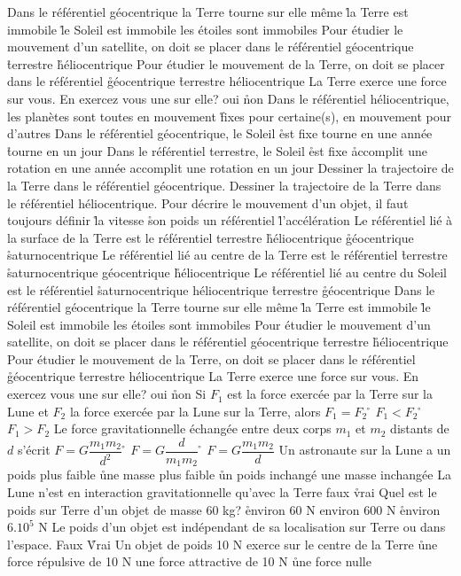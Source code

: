 \q
Dans le référentiel géocentrique
\rv
la Terre tourne sur elle même
\r
la Terre est immobile
\r
le Soleil est immobile
\rv
les étoiles sont immobiles
\q
Pour étudier le mouvement d'un satellite, on doit se placer dans le référentiel
\rv
géocentrique
\r
terrestre
\r
héliocentrique
\q
Pour étudier le mouvement de la Terre, on doit se placer dans le référentiel
\r
géocentrique
\r
terrestre
\rv
héliocentrique
\q
La Terre exerce une force sur vous. En exercez vous une sur elle?
\rv
oui
\r
non
\q
Dans le référentiel héliocentrique, les planètes sont
\rv
toutes en mouvement
\r
fixes pour certaine(s), en mouvement pour d'autres
\q
Dans le référentiel géocentrique, le Soleil 
\r
est fixe
\rv
tourne en une année
\r
tourne en un jour
\q
Dans le référentiel terrestre, le Soleil 
\r
est fixe
\r
accomplit une rotation en une année
\rv
accomplit une rotation en un jour
\q
Dessiner la trajectoire de la Terre dans le référentiel géocentrique.
\q
Dessiner la trajectoire de la Terre dans le référentiel héliocentrique.
 \q
        Pour décrire le mouvement d'un objet, il faut toujours définir 
  \r
       la vitesse
  \r
       son poids
  \rv
       un référentiel
  \r
       l'accélération
  \q
  Le référentiel lié à la surface de la Terre est le référentiel 
  \rv
       terrestre
  \r
       héliocentrique
  \r
       géocentrique
  \r
       saturnocentrique
  \q
  Le référentiel lié au centre de la Terre est le référentiel 
  \r
       terrestre
  \r
       saturnocentrique
  \rv
       géocentrique
  \r
       héliocentrique
  \q
  Le référentiel lié au centre du Soleil est le référentiel 
  \r
       saturnocentrique
  \rv
       héliocentrique
  \r
       terrestre
  \r
       géocentrique
\q
Dans le référentiel géocentrique
\rv
la Terre tourne sur elle même
\r
la Terre est immobile
\r
le Soleil est immobile
\rv
les étoiles sont immobiles
\q
Pour étudier le mouvement d'un satellite, on doit se placer dans le référentiel
\rv
géocentrique
\r
terrestre
\r
héliocentrique
\q
Pour étudier le mouvement de la Terre, on doit se placer dans le référentiel
\r
géocentrique
\r
terrestre
\rv
héliocentrique
\q
La Terre exerce une force sur vous. En exercez vous une sur elle?
\rv
oui
\r
non
\q
Si $F_1$ est la force exercée par la Terre sur la Lune et $F_2$ la force exercée par la Lune sur la Terre, alors
\rv
$F_1=F_2$
\r
$F_1<F_2$
\r
$F_1>F_2$
\q
Le force gravitationnelle échangée entre deux corps $m_1$ et $m_2$ distants de $d$ s'écrit
\rv
$F=G\dfrac{m_1 m_2}{d^{2}}$
\r
$F=G\dfrac{d}{m_1 m_2}$
\r
$F=G\dfrac{m_1 m_2}{d}$
\q
Un astronaute sur la Lune a
\rv
un poids plus faible
\r
une masse plus faible
\r
un poids inchangé
\rv
une masse inchangée
\q
La Lune n'est en interaction gravitationnelle qu'avec la Terre
\rv
faux
\r
vrai
\q
Quel est le poids sur Terre d'un objet de masse 60 kg?
\r
environ 60 N
\rv
environ 600 N
\r
environ $6.10^5$ N
\q
Le poids d'un objet est indépendant de sa localisation sur Terre ou dans l'espace.
\rv
Faux
\r
Vrai
\q
Un objet de poids 10 N exerce sur le centre de la Terre
\r    
une force répulsive de 10 N
\rv
une force attractive de 10 N
\r
une force nulle